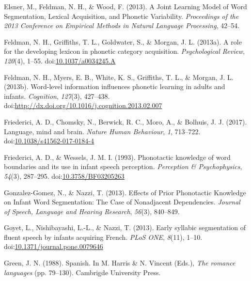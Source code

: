 \documentclass[man,floatsintext]{apa6}
\begin{document}
\leavevmode\hypertarget{ref-elsner2013}{}%
Elsner, M., Feldman, N. H., \& Wood, F. (2013). A Joint Learning Model of Word Segmentation, Lexical Acquisition, and Phonetic Variability. \emph{Proceedings of the 2013 Conference on Empirical Methods in Natural Language Processing}, 42--54.

\leavevmode\hypertarget{ref-feldman2013b}{}%
Feldman, N. H., Griffiths, T. L., Goldwater, S., \& Morgan, J. L. (2013a). A role for the developing lexicon in phonetic category acquisition. \emph{Psychological Review}, \emph{120}(4), 1--55. doi:\href{https://doi.org/10.1037/a0034245.A}{10.1037/a0034245.A}

\leavevmode\hypertarget{ref-feldman2013a}{}%
Feldman, N. H., Myers, E. B., White, K. S., Griffiths, T. L., \& Morgan, J. L. (2013b). Word-level information influences phonetic learning in adults and infants. \emph{Cognition}, \emph{127}(3), 427--438. doi:\href{https://doi.org/http://dx.doi.org/10.1016/j.cognition.2013.02.007}{http://dx.doi.org/10.1016/j.cognition.2013.02.007}

\leavevmode\hypertarget{ref-friederici2017}{}%
Friederici, A. D., Chomsky, N., Berwick, R. C., Moro, A., \& Bolhuis, J. J. (2017). Language, mind and brain. \emph{Nature Human Behaviour}, \emph{1}, 713--722. doi:\href{https://doi.org/10.1038/s41562-017-0184-4}{10.1038/s41562-017-0184-4}

\leavevmode\hypertarget{ref-friederici1993}{}%
Friederici, A. D., \& Wessels, J. M. I. (1993). Phonotactic knowledge of word boundaries and its use in infant speech perception. \emph{Perception \& Psychophysics}, \emph{54}(3), 287--295. doi:\href{https://doi.org/10.3758/BF03205263}{10.3758/BF03205263}

\leavevmode\hypertarget{ref-gonzalezgomez2013}{}%
Gonzalez-Gomez, N., \& Nazzi, T. (2013). Effects of Prior Phonotactic Knowledge on Infant Word Segmentation: The Case of Nonadjacent Dependencies. \emph{Journal of Speech, Language and Hearing Research}, \emph{56}(3), 840--849.

\leavevmode\hypertarget{ref-goyet2013}{}%
Goyet, L., Nishibayashi, L.-L., \& Nazzi, T. (2013). Early syllabic segmentation of fluent speech by infants acquiring French. \emph{PLoS ONE}, \emph{8}(11), 1--10. doi:\href{https://doi.org/10.1371/journal.pone.0079646}{10.1371/journal.pone.0079646}

\leavevmode\hypertarget{ref-green1988}{}%
Green, J. N. (1988). Spanish. In M. Harris \& N. Vincent (Eds.), \emph{The romance languages} (pp. 79--130). Cambrigde University Press.
\end{document}
